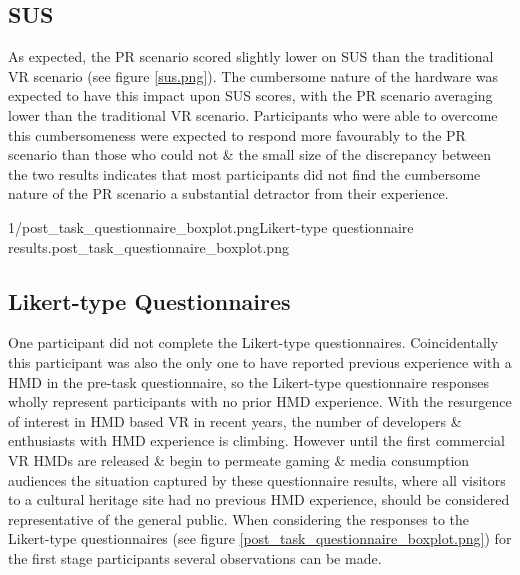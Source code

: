 
\subsection{SUS}
As expected, the PR scenario scored slightly lower on SUS than the traditional VR scenario (see figure \ref{sus.png}). The cumbersome nature of the hardware was expected to have this impact upon SUS scores, with the PR scenario averaging lower than the traditional VR scenario. Participants who were able to overcome this cumbersomeness were expected to respond more favourably to the PR scenario than those who could not \& the small size of the discrepancy between the two results indicates that most participants did not find the cumbersome nature of the PR scenario a substantial detractor from their experience.

       {1/post_task_questionnaire_boxplot.png}{Likert-type questionnaire results.}{post_task_questionnaire_boxplot.png}


\subsection{Likert-type Questionnaires}

One participant did not complete the Likert-type questionnaires. Coincidentally this participant was also the only one to have reported previous experience with a HMD in the pre-task questionnaire, so the Likert-type questionnaire responses wholly represent participants with no prior HMD experience. With the resurgence of interest in HMD based VR in recent years, the number of developers \& enthusiasts with HMD experience is climbing. However until the first commercial VR HMDs are released \& begin to permeate gaming \& media consumption audiences the situation captured by these questionnaire results, where all visitors to a cultural heritage site had no previous HMD experience, should be considered representative of the general public. When considering the responses to the Likert-type questionnaires (see figure \ref{post_task_questionnaire_boxplot.png}) for the first stage participants several observations can be made.

